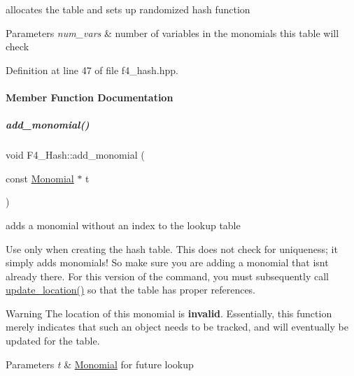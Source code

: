 allocates the table and sets up randomized hash function 


\begin{DoxyParams}{Parameters}
{\em num\+\_\+vars} & number of variables in the monomials this table will check \\
\hline
\end{DoxyParams}


Definition at line 47 of file f4\+\_\+hash.\+hpp.



\paragraph{Member Function Documentation}
\mbox{\label{group___g_b_computation_aaed2c308a7d79e098e6555d20b1720d0}} 
\subparagraph{\texorpdfstring{add\+\_\+monomial()}{add\_monomial()}\hspace{0.1cm}{\footnotesize\ttfamily [1/2]}}
{\footnotesize\ttfamily void F4\+\_\+\+Hash\+::add\+\_\+monomial (\begin{DoxyParamCaption}\item[{const \hyperlink{group__polygroup_class_monomial}{Monomial} $\ast$}]{t }\end{DoxyParamCaption})\hspace{0.3cm}{\ttfamily [inline]}}



adds a monomial without an index to the lookup table 

Use only when creating the hash table. This does not check for uniqueness; it simply adds monomials! So make sure you are adding a monomial that isn\textquotesingle{}t already there. For this version of the command, you must subsequently call {\ttfamily \hyperlink{group___g_b_computation_a0f1a52f055247e86e6b65446c65a87b5}{update\+\_\+location()}} so that the table has proper references. \begin{DoxyWarning}{Warning}
The location of this monomial is {\bfseries invalid}. Essentially, this function merely indicates that such an object needs to be tracked, and will eventually be updated for the table. 
\end{DoxyWarning}

\begin{DoxyParams}{Parameters}
{\em t} & {\ttfamily \hyperlink{group__polygroup_class_monomial}{Monomial}} for future lookup \\
\hline
\end{DoxyParams}


